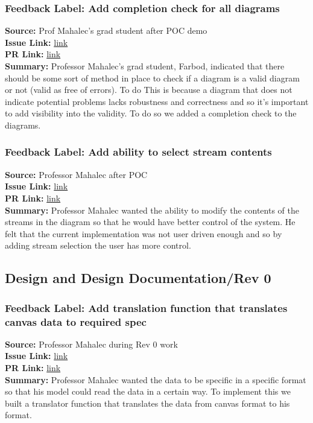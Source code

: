 \documentclass{article}
\begin{document}
    \subsubsection*{Feedback Label: Add completion check for all diagrams}
    \textbf{Source:} Prof Mahalec's grad student after POC demo \\
    \textbf{Issue Link:} \href{https://github.com/MadhuranS/capstone/issues/166}{link} \\
    \textbf{PR Link:} \href{https://github.com/MadhuranS/capstone/pull/169}{link} \\
    \textbf{Summary:} Professor Mahalec's grad student, Farbod, indicated that there should be some sort of method in place to check if a diagram is a valid diagram or not (valid as free of errors). To do This is because a diagram that does not indicate potential problems lacks robustness and correctness and so it's important to add visibility into the validity. To do so we added a completion check to the diagrams. 


    \subsubsection*{Feedback Label: Add ability to select stream contents}
    \textbf{Source:} Professor Mahalec after POC \\
    \textbf{Issue Link:} \href{https://github.com/MadhuranS/capstone/issues/98}{link} \\
    \textbf{PR Link:} \href{https://github.com/MadhuranS/capstone/pull/127}{link} \\
    \textbf{Summary:} Professor Mahalec wanted the ability to modify the contents of the streams in the diagram so that he would have better control of the system. He felt that the current implementation was not user driven enough and so by adding stream selection the user has more control. 
\subsection{Design and Design Documentation/Rev 0}

    \subsubsection*{Feedback Label: Add translation function that translates canvas data to required spec}
    \textbf{Source:} Professor Mahalec during Rev 0 work \\
    \textbf{Issue Link:} \href{https://github.com/MadhuranS/capstone/issues/139}{link} \\
    \textbf{PR Link:} \href{https://github.com/MadhuranS/capstone/pull/194}{link} \\
    \textbf{Summary:} Professor Mahalec wanted the data to be specific in a specific format so that his model could read the data in a certain way. To implement this we built a translator function that translates the data from canvas format to his format.  
\end{document}
